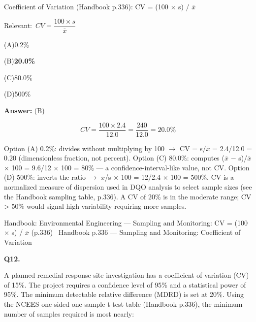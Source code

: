 \documentclass[11pt]{article}
\newcommand{\correct}[1]{\textbf{#1}\;{\color{accent}$\checkmark$}}
\newcommand{\optline}[2]{\par\noindent\hspace{1.2em}(#1)\hspace{0.6em}#2}
\begin{document}
Coefficient of Variation (Handbook p.336):
CV = (100 $\times$ s) / $\bar{x}$\par\vspace{3pt}
{\small\color{soft}Relevant:}\ $CV = \dfrac{100 \times s}{\bar{x}}$\par\vspace{3pt}
\optline{A}{0.2\%}
\optline{B}{\correct{20.0\%}}
\optline{C}{80.0\%}
\optline{D}{500\%}
\par\vspace{3pt}
\vspace{2pt}\par\noindent\colorbox{boxbg}{\parbox{\dimexpr\linewidth-2\fboxsep\relax}{%
\vspace{2pt}\textbf{Answer:} (B)\par\vspace{2pt}
{\small \[CV = \frac{100 \times 2.4}{12.0} = \frac{240}{12.0} = 20.0\%\]

Option (A) 0.2\%: divides without multiplying by 100 $\rightarrow$ CV = s/$\bar{x}$ = 2.4/12.0 = 0.20 (dimensionless fraction, not percent). Option (C) 80.0\%: computes ($\bar{x}$ $-$ s)/$\bar{x}$ $\times$ 100 = 9.6/12 $\times$ 100 = 80\% --- a confidence-interval-like value, not CV. Option (D) 500\%: inverts the ratio $\rightarrow$ $\bar{x}$/s $\times$ 100 = 12/2.4 $\times$ 100 = 500\%. CV is a normalized measure of dispersion used in DQO analysis to select sample sizes (see the Handbook sampling table, p.336). A CV of 20\% is in the moderate range; CV > 50\% would signal high variability requiring more samples.}\par\vspace{2pt}
{\footnotesize\color{soft}Handbook: Environmental Engineering --- Sampling and Monitoring: CV = (100 $\times$ s) / $\bar{x}$ (p.336) \textbullet\ Handbook p.336 --- Sampling and Monitoring: Coefficient of Variation}\vspace{2pt}
}}
\vspace{9pt}
\filbreak
\textbf{\color{accent}Q12.}\par\vspace{2pt}
A planned remedial response site investigation has a coefficient of variation (CV) of 15\%. The project requires a confidence level of 95\% and a statistical power of 95\%. The minimum detectable relative difference (MDRD) is set at 20\%. Using the NCEES one-sided one-sample t-test table (Handbook p.336), the minimum number of samples required is most nearly:\par\vspace{3pt}
\end{document}
